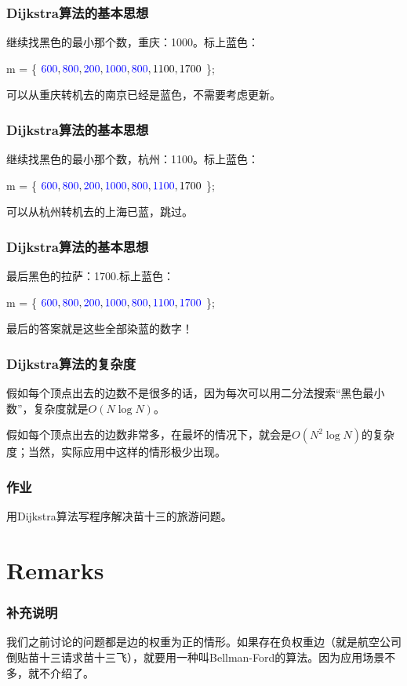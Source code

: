 \documentclass[CJK,14pt]{beamer}
\begin{document}
\begin{frame}
  \frametitle{Dijkstra算法的基本思想}
  继续找黑色的最小那个数，重庆：1000。标上蓝色：

  m = \{ ${\color{blue} 600}, {\color{blue} 800}, {\color{blue} 200}, {\color{blue} 1000}, {\color{blue} 800}, 1100, 1700$ \};

  可以从重庆转机去的南京已经是蓝色，不需要考虑更新。
\end{frame}


\begin{frame}
  \frametitle{Dijkstra算法的基本思想}
  继续找黑色的最小那个数，杭州：1100。标上蓝色：

  m = \{ ${\color{blue} 600}, {\color{blue} 800}, {\color{blue} 200}, {\color{blue} 1000}, {\color{blue} 800}, {\color{blue} 1100}, 1700$ \};

  可以从杭州转机去的上海已蓝，跳过。
\end{frame}


\begin{frame}
  \frametitle{Dijkstra算法的基本思想}
  最后黑色的拉萨：1700.标上蓝色：

  m = \{ ${\color{blue} 600}, {\color{blue} 800}, {\color{blue} 200}, {\color{blue} 1000}, {\color{blue} 800}, {\color{blue} 1100}, {\color{blue} 1700}$ \};

  最后的答案就是这些全部染蓝的数字！
\end{frame}


\begin{frame}
  \frametitle{Dijkstra算法的复杂度}
  假如每个顶点出去的边数不是很多的话，因为每次可以用二分法搜索“黑色最小数”，复杂度就是$O(N\log N)$。

  假如每个顶点出去的边数非常多，在最坏的情况下，就会是$O(N^2\log N)$的复杂度；当然，实际应用中这样的情形极少出现。

\end{frame}

\begin{frame}
  \frametitle{作业}
  用Dijkstra算法写程序解决苗十三的旅游问题。
\end{frame}


\section{Remarks}

\begin{frame}
  \frametitle{补充说明}
  我们之前讨论的问题都是边的权重为正的情形。如果存在负权重边（就是航空公司倒贴苗十三请求苗十三飞），就要用一种叫Bellman-Ford的算法。因为应用场景不多，就不介绍了。
\end{frame}

  \ech
\end{document}
